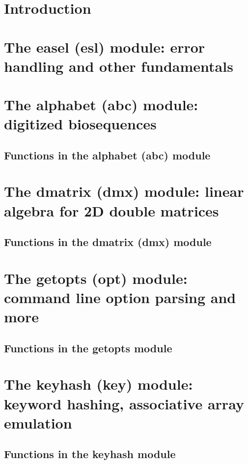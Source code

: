 \documentclass[11pt]{article}
\begin{document}




\newpage
\tableofcontents

\newpage
\section{Introduction}


\newpage
\section{The easel (esl) module: error handling and other fundamentals}


\newpage
\section{The alphabet (abc) module: digitized biosequences}

\subsection{Functions in the alphabet (abc) module}


\newpage
\section{The dmatrix (dmx) module: linear algebra for 2D double matrices}
\subsection{Functions in the dmatrix (dmx) module}


\newpage
\section{The getopts (opt) module: command line option parsing and more}

\subsection{Functions in the getopts module}


\newpage
\section{The keyhash (key) module: keyword hashing, associative array emulation}

\subsection{Functions in the keyhash module}

\end{document}
